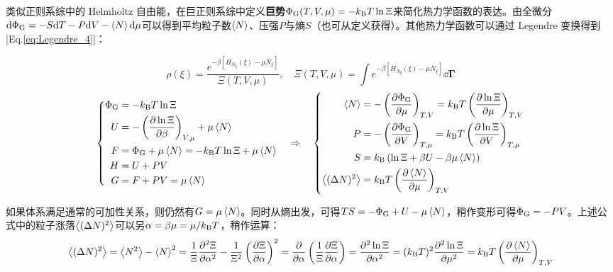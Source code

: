 类似正则系综中的 Helmholtz 自由能，在巨正则系综中定义\textbf{巨势}$\Phi_{\rm G}(T,V,\mu)=-k_{\rm B}T\ln \Xi$来简化热力学函数的表达。由全微分$\dd\Phi_{\rm G}=-S\dd T-P\dd V-\expval{N}\dd\mu$可以得到平均粒子数$\expval{N}$、压强$P$与熵$S$（也可从定义获得）。其他热力学函数可以通过 Legendre 变换得到 [Eq.\eqref{eq:Legendre_4}]：
\begin{theorem}[巨正则系综的基本热力学关系]
\[\rho(\xi)=\frac{e^{-\beta [H_{N_{\xi}}(\xi)-\mu N_{\xi}]}}{\Xi(T,V,\mu)},\quad \Xi(T,V,\mu)=\int e^{-\beta [H_{N_{\xi}}(\xi)-\mu N_{\xi}]}\dd\bm{\Gamma}\]
\[\left\{\begin{aligned}
\Phi_{\rm G}&=-k_{\rm B}T\ln\Xi\\
U&=-\left(\pdv{\ln\Xi}{\beta}\right)_{V,\mu}+\mu \expval{N}\\
F&=\Phi_{\rm G}+\mu \expval{N}=-k_{\rm B}T\ln\Xi+\mu \expval{N}\\
H&=U+PV\\
G&=F+PV=\mu \expval{N}
\end{aligned}\right.
\quad \Rightarrow \quad
\left\{\begin{aligned}
\expval{N}&=-\left(\pdv{\Phi_{\rm G}}{\mu}\right)_{T,V}=k_{\rm B}T\left(\pdv{\ln\Xi}{\mu}\right)_{T,V}\\
P&=-\left(\pdv{\Phi_{\rm G}}{V}\right)_{T,\mu}=k_{\rm B}T\left(\pdv{\ln\Xi}{V}\right)_{T,\mu}\\
S&=k_{\rm B}\left(\ln\Xi+\beta U-\beta\mu \expval{N}\right)\\
\expval{(\Delta N)^2}&=k_{\rm B}T\left(\pdv{\expval{N}}{\mu}\right)_{T,V}
\end{aligned}\right.\]
\end{theorem}
如果体系满足通常的可加性关系，则仍然有$G=\mu \expval{N}$。同时从熵出发，可得$TS=-\Phi_{\rm G}+U-\mu \expval{N}$，稍作变形可得$\Phi_{\rm G}=-PV$。上述公式中的粒子涨落$\expval{(\Delta N)^2}$可以另$\alpha=\beta\mu=\mu/k_{\rm B}T$，稍作运算：
\[\expval{(\Delta N)^2}=\expval{N^2}-\expval{N}^2=\frac{1}{\Xi}\pdv[2]{\Xi}{\alpha}-\frac{1}{\Xi^2}\left(\pdv{\Xi}{\alpha}\right)^2=\pdv{\alpha}\left(\frac{1}{\Xi}\pdv{\Xi}{\alpha}\right)=\pdv[2]{\ln\Xi}{\alpha}=(k_{\rm B}T)^2\pdv[2]{\ln\Xi}{\mu}=k_{\rm B}T\left(\pdv{\expval{N}}{\mu}\right)_{T,V}\]

